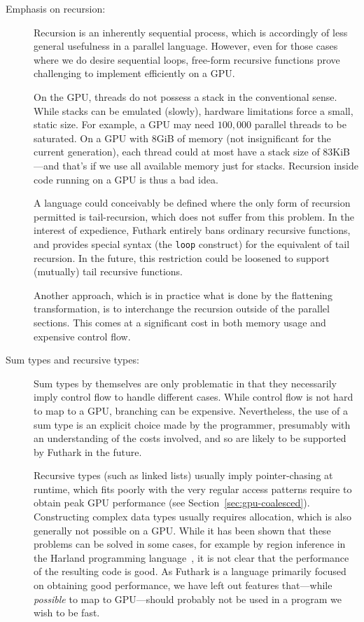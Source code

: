 \begin{description}
\item[Emphasis on recursion:] Recursion is an inherently sequential
  process, which is accordingly of less general usefulness in a
  parallel language.  However, even for those cases where we do desire
  sequential loops, free-form recursive functions prove challenging to
  implement efficiently on a GPU.

  On the GPU, threads do not possess a stack in the conventional
  sense.  While stacks can be emulated (slowly), hardware limitations
  force a small, static size.  For example, a GPU may need $100,000$
  parallel threads to be saturated.  On a GPU with 8GiB of memory (not
  insignificant for the current generation), each thread could at most
  have a stack size of 83KiB---and that's if we use all available
  memory just for stacks.  Recursion inside code running on a GPU is
  thus a bad idea.

  A language could conceivably be defined where the only form of
  recursion permitted is tail-recursion, which does not suffer from
  this problem.  In the interest of expedience, Futhark entirely bans
  ordinary recursive functions, and provides special syntax (the
  \lstinline{loop} construct) for the equivalent of tail recursion.
  In the future, this restriction could be loosened to support
  (mutually) tail recursive functions.

  Another approach, which is in practice what is done by the
  flattening transformation, is to interchange the recursion outside
  of the parallel sections.  This comes at a significant cost in both
  memory usage and expensive control flow.

\item[Sum types and recursive types:] Sum types by themselves are only
  problematic in that they necessarily imply control flow to handle
  different cases.  While control flow is not hard to map to a GPU,
  branching can be expensive.  Nevertheless, the use of a sum type is
  an explicit choice made by the programmer, presumably with an
  understanding of the costs involved, and so are likely to be
  supported by Futhark in the future.

  Recursive types (such as linked lists) usually imply pointer-chasing
  at runtime, which fits poorly with the very regular access patterns
  require to obtain peak GPU performance (see
  Section~\ref{sec:gpu-coalesced}).  Constructing complex data types
  usually requires allocation, which is also generally not possible on
  a GPU.  While it has been shown that these problems can be solved in
  some cases, for example by region inference in the Harland
  programming language~\cite{holk2014region}, it is not clear that the
  performance of the resulting code is good.  As Futhark is a language
  primarily focused on obtaining good performance, we have left out
  features that---while \textit{possible} to map to GPU---should
  probably not be used in a program we wish to be fast.


\end{description}
